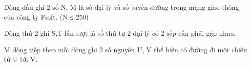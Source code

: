 Dòng đầu ghi 2 số N, M là số đại lý và số tuyến đường trong mạng giao thông của công ty Fsoft. (N ≤ 250)

Dòng thứ 2 ghi S,T lần lượt là số thứ tự 2 đại lý có 2 sếp cần phải gặp nhau.

M dòng tiếp theo mỗi dòng ghi 2 số nguyên U, V thể hiện có đường đi một chiều từ U tới V.

\